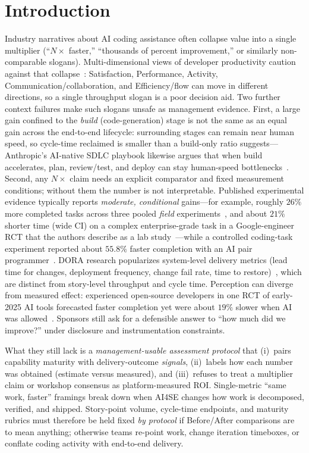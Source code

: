 \documentclass[10pt,conference]{IEEEtran}
\begin{document}
\section{Introduction}
\label{sec:intro}

Industry narratives about AI coding assistance often collapse value into a single multiplier (``$N\times$ faster,'' ``thousands of percent improvement,'' or similarly non-comparable slogans).
Multi-dimensional views of developer productivity caution against that collapse~\cite{Forsgren2021SPACE}: Satisfaction, Performance, Activity, Communication/collaboration, and Efficiency/flow can move in different directions, so a single throughput slogan is a poor decision aid.
Two further context failures make such slogans unsafe as management evidence.
First, a large gain confined to the \emph{build} (code-generation) stage is not the same as an equal gain across the end-to-end lifecycle: surrounding stages can remain near human speed, so cycle-time reclaimed is smaller than a build-only ratio suggests---Anthropic's AI-native SDLC playbook likewise argues that when build accelerates, plan, review/test, and deploy can stay human-speed bottlenecks~\cite{Anthropic2026AISDLCPlaybook}.
Second, any $N\times$ claim needs an explicit comparator and fixed measurement conditions; without them the number is not interpretable.
Published experimental evidence typically reports \emph{moderate, conditional} gains---for example, roughly $26\%$ more completed tasks across three pooled \emph{field} experiments~\cite{Cui2026GenAIField}, and about $21\%$ shorter time (wide CI) on a complex enterprise-grade task in a Google-engineer RCT that the authors describe as a lab study~\cite{Paradis2024GoogleAISpeed}---while a controlled coding-task experiment reported about $55.8\%$ faster completion with an AI pair programmer~\cite{Peng2023Copilot}.
DORA research popularizes system-level delivery metrics (lead time for changes, deployment frequency, change fail rate, time to restore)~\cite{Forsgren2018Accelerate}, which are distinct from story-level throughput and cycle time.
Perception can diverge from measured effect: experienced open-source developers in one RCT of early-2025 AI tools forecasted faster completion yet were about $19\%$ slower when AI was allowed~\cite{METR2025AIProductivity}.
Sponsors still ask for a defensible answer to ``how much did we improve?'' under disclosure and instrumentation constraints.

What they still lack is a \emph{management-usable assessment protocol} that (i)~pairs capability maturity with delivery-outcome \emph{signals}, (ii)~labels how each number was obtained (estimate versus measured), and (iii)~refuses to treat a multiplier claim or workshop consensus as platform-measured ROI.
Single-metric ``same work, faster'' framings break down when AI4SE changes how work is decomposed, verified, and shipped.
Story-point volume, cycle-time endpoints, and maturity rubrics must therefore be held fixed \emph{by protocol} if Before/After comparisons are to mean anything; otherwise teams re-point work, change iteration timeboxes, or conflate coding activity with end-to-end delivery.
\end{document}
